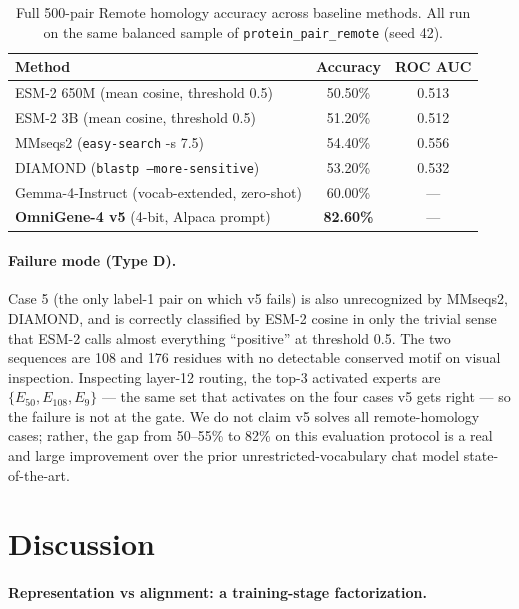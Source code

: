 \documentclass[11pt]{article}
\begin{document}
\begin{table}[H]
\centering
\small
\caption{Full 500-pair Remote homology accuracy across baseline methods. All run on the same balanced sample of \texttt{protein\_pair\_remote} (seed 42).}
\label{tab:full_baseline}
\begin{tabular}{lcc}
\toprule
\textbf{Method} & \textbf{Accuracy} & \textbf{ROC AUC} \\
\midrule
ESM-2 650M (mean cosine, threshold 0.5)   & 50.50\% & 0.513 \\
ESM-2 3B (mean cosine, threshold 0.5)     & 51.20\% & 0.512 \\
MMseqs2 (\texttt{easy-search} -s 7.5)     & 54.40\% & 0.556 \\
DIAMOND (\texttt{blastp --more-sensitive})& 53.20\% & 0.532 \\
Gemma-4-Instruct (vocab-extended, zero-shot) & 60.00\% & --- \\
\midrule
\textbf{OmniGene-4 v5} (4-bit, Alpaca prompt) & \textbf{82.60\%} & --- \\
\bottomrule
\end{tabular}
\end{table}

\paragraph{Failure mode (Type D).}
Case 5 (the only label-1 pair on which v5 fails) is also unrecognized by MMseqs2, DIAMOND, and is correctly classified by ESM-2 cosine in only the trivial sense that ESM-2 calls almost everything ``positive'' at threshold 0.5. The two sequences are 108 and 176 residues with no detectable conserved motif on visual inspection. Inspecting layer-12 routing, the top-3 activated experts are $\{E_{50}, E_{108}, E_9\}$ --- the same set that activates on the four cases v5 gets right --- so the failure is not at the gate. We do not claim v5 solves all remote-homology cases; rather, the gap from 50--55\% to 82\% on this evaluation protocol is a real and large improvement over the prior unrestricted-vocabulary chat model state-of-the-art.

\section{Discussion}
\label{sec:discussion}

\paragraph{Representation vs alignment: a training-stage factorization.}
\end{document}

